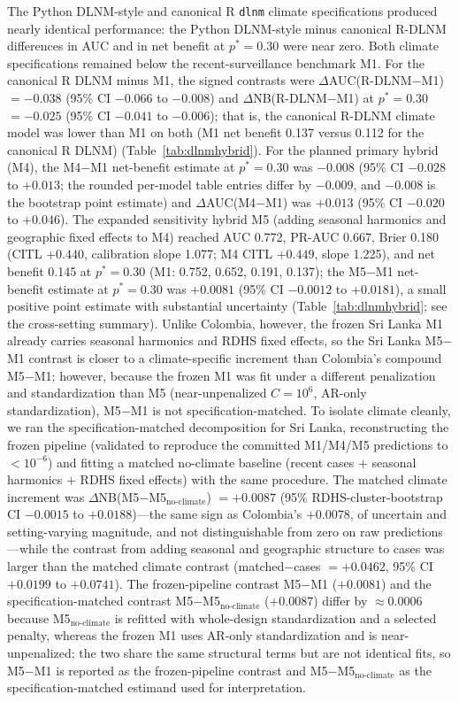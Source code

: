 \documentclass[11pt,a4paper]{article}
\begin{document}
The Python DLNM-style and canonical R \texttt{dlnm} climate specifications produced nearly identical performance: the Python DLNM-style minus canonical R-DLNM differences in AUC and in net benefit at $p^*=0.30$ were near zero. Both climate specifications remained below the recent-surveillance benchmark M1. For the canonical R DLNM minus M1, the signed contrasts were $\Delta$AUC(R\nobreakdash-DLNM$-$M1) $=-0.038$ (95\% CI $-0.066$ to $-0.008$) and $\Delta$NB(R\nobreakdash-DLNM$-$M1) at $p^*=0.30$ $=-0.025$ (95\% CI $-0.041$ to $-0.006$); that is, the canonical R-DLNM climate model was lower than M1 on both (M1 net benefit 0.137 versus 0.112 for the canonical R DLNM) (Table~\ref{tab:dlnmhybrid}). For the planned primary hybrid (M4), the M4$-$M1 net-benefit estimate at $p^*=0.30$ was $-0.008$ (95\% CI $-0.028$ to $+0.013$; the rounded per-model table entries differ by $-0.009$, and $-0.008$ is the bootstrap point estimate) and $\Delta$AUC(M4$-$M1) was $+0.013$ (95\% CI $-0.020$ to $+0.046$). The expanded sensitivity hybrid M5 (adding seasonal harmonics and geographic fixed effects to M4) reached AUC 0.772, PR-AUC 0.667, Brier 0.180 (CITL $+0.440$, calibration slope 1.077; M4 CITL $+0.449$, slope 1.225), and net benefit 0.145 at $p^*=0.30$ (M1: 0.752, 0.652, 0.191, 0.137); the M5$-$M1 net-benefit estimate at $p^*=0.30$ was $+0.0081$ (95\% CI $-0.0012$ to $+0.0181$), a small positive point estimate with substantial uncertainty (Table~\ref{tab:dlnmhybrid}; see the cross-setting summary). Unlike Colombia, however, the frozen Sri Lanka M1 already carries seasonal harmonics and RDHS fixed effects, so the Sri Lanka M5$-$M1 contrast is closer to a climate-specific increment than Colombia's compound M5$-$M1; however, because the frozen M1 was fit under a different penalization and standardization than M5 (near-unpenalized $C{=}10^{6}$, AR-only standardization), M5$-$M1 is not specification-matched. To isolate climate cleanly, we ran the specification-matched decomposition for Sri Lanka, reconstructing the frozen pipeline (validated to reproduce the committed M1/M4/M5 predictions to $<10^{-6}$) and fitting a matched no-climate baseline (recent cases $+$ seasonal harmonics $+$ RDHS fixed effects) with the same procedure. The matched climate increment was $\Delta$NB(M5$-$M5$_{\text{no-climate}}$) $=+0.0087$ (95\% RDHS-cluster-bootstrap CI $-0.0015$ to $+0.0188$)---the same sign as Colombia's $+0.0078$, of uncertain and setting-varying magnitude, and not distinguishable from zero on raw predictions---while the contrast from adding seasonal and geographic structure to cases was larger than the matched climate contrast (matched$-$cases $=+0.0462$, 95\% CI $+0.0199$ to $+0.0741$). The frozen-pipeline contrast M5$-$M1 ($+0.0081$) and the specification-matched contrast M5$-$M5$_{\text{no-climate}}$ ($+0.0087$) differ by $\approx0.0006$ because M5$_{\text{no-climate}}$ is refitted with whole-design standardization and a selected penalty, whereas the frozen M1 uses AR-only standardization and is near-unpenalized; the two share the same structural terms but are not identical fits, so M5$-$M1 is reported as the frozen-pipeline contrast and M5$-$M5$_{\text{no-climate}}$ as the specification-matched estimand used for interpretation.
\end{document}

